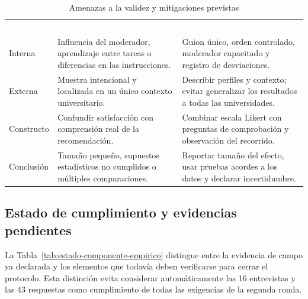 \documentclass[12pt,a4paper]{article}
\begin{document}
\begin{table}[H]
\centering
\caption{Amenazas a la validez y mitigaciones previstas}
\label{tab:amenazas-validez}
\small
{}
\begin{tabularx}{\textwidth}{L{2.65cm} Y Y}
\textcolor{white}{\textbf{Categoría}} &
\textcolor{white}{\textbf{Amenaza}} &
\textcolor{white}{\textbf{Mitigación prevista}}\\
Interna & Influencia del moderador, aprendizaje entre tareas o diferencias en las instrucciones. & Guion único, orden controlado, moderador capacitado y registro de desviaciones.\\
Externa & Muestra intencional y localizada en un único contexto universitario. & Describir perfiles y contexto; evitar generalizar los resultados a todas las universidades.\\
Constructo & Confundir satisfacción con comprensión real de la recomendación. & Combinar escala Likert con preguntas de comprobación y observación del recorrido.\\
Conclusión & Tamaño pequeño, supuestos estadísticos no cumplidos o múltiples comparaciones. & Reportar tamaño del efecto, usar pruebas acordes a los datos y declarar incertidumbre.\\
\end{tabularx}
\end{table}

\subsection{Estado de cumplimiento y evidencias pendientes}

La Tabla~\ref{tab:estado-componente-empirico} distingue entre la evidencia de campo ya declarada y los elementos que todavía deben verificarse para cerrar el protocolo. Esta distinción evita considerar automáticamente las 16 entrevistas y las 43 respuestas como cumplimiento de todas las exigencias de la segunda ronda.
\end{document}
